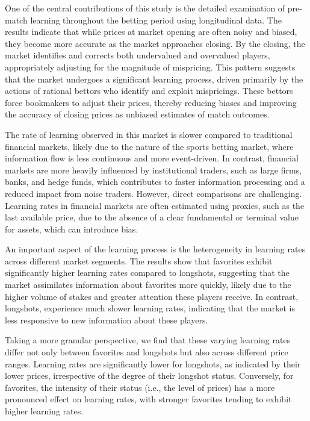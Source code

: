 \documentclass[webpdf,modern,medium]{oup-authoring-template}
\theoremstyle{thmstyleone}%
\theoremstyle{thmstyletwo}%
\theoremstyle{thmstylethree}%
\begin{document}
    One of the central contributions of this study is the detailed examination of pre-match learning throughout the betting period using longitudinal data. The results indicate that while prices at market opening are often noisy and biased, they become more accurate as the market approaches closing. By the closing, the market identifies and corrects both undervalued and overvalued players, appropriately adjusting for the magnitude of mispricing. This pattern suggests that the market undergoes a significant learning process, driven primarily by the actions of rational bettors who identify and exploit mispricings. These bettors force bookmakers to adjust their prices, thereby reducing biases and improving the accuracy of closing prices as unbiased estimates of match outcomes.

    The rate of learning observed in this market is slower compared to traditional financial markets, likely due to the nature of the sports betting market, where information flow is less continuous and more event-driven. In contrast, financial markets are more heavily influenced by institutional traders, such as large firms, banks, and hedge funds, which contributes to faster information processing and a reduced impact from noise traders. However, direct comparisons are challenging. Learning rates in financial markets are often estimated using proxies, such as the last available price, due to the absence of a clear fundamental or terminal value for assets, which can introduce bias.

    An important aspect of the learning process is the heterogeneity in learning rates across different market segments. The results show that favorites exhibit significantly higher learning rates compared to longshots, suggesting that the market assimilates information about favorites more quickly, likely due to the higher volume of stakes and greater attention these players receive.
    In contrast, longshots, experience much slower learning rates, indicating that the market is less responsive to new information about these players.

    Taking a more granular perspective, we find that these varying learning rates differ not only between favorites and longshots but also across different price ranges. Learning rates are significantly lower for longshots, as indicated by their lower prices, irrespective of the degree of their longshot status. Conversely, for favorites, the intensity of their status (i.e., the level of prices) has a more pronounced effect on learning rates, with stronger favorites tending to exhibit higher learning rates.
\end{document}
